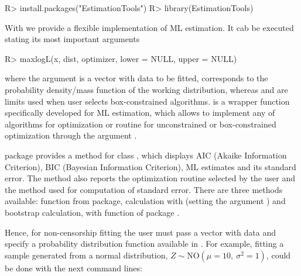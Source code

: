 \documentclass[nojss]{jss}
\begin{document}
\begin{Schunk}
\begin{Sinput}
R> install.packages("EstimationTools")
R> library(EstimationTools)
\end{Sinput}
\end{Schunk}

With  we provide a flexible implementation of ML estimation. It cab be executed stating its most important arguments

\begin{Schunk}
\begin{Sinput}
R> maxlogL(x, dist, optimizer, lower = NULL, upper = NULL)
\end{Sinput}
\end{Schunk}

where the argument  is a vector with data to be fitted,  corresponds to the probability density/mass function of the working distribution, whereas  and  are limits used when user selects box-constrained algorithms.  is a wrapper function specifically developed for ML estimation, which allows to implement any of  algorithms for optimization or  routine for unconstrained or box-constrained optimization through the argument .

 package provides a  method for class , which displays AIC (Akaike Information Criterion), BIC (Bayesian Information Criterion), ML estimates and its standard error. The method also reports the optimization routine selected by the user and the method used for computation of standard error. There are three methods available:  function from  package, calculation with  (setting the argument ) and bootstrap calculation, with  function of  package \citep{Davison1997, Canty2017}.

Hence, for non-censorship fitting the user must pass a vector with data and specify a probability distribution function available in . For example, fitting a sample generated from a normal distribution, $Z \sim \text{NO}(\mu=10,\: \sigma^2=1)$, could be done with the next command lines:
\end{document}
